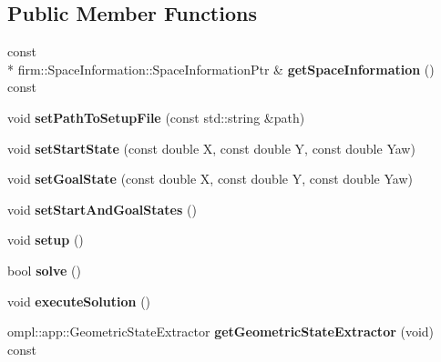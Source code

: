 \subsection*{Public Member Functions}
\begin{DoxyCompactItemize}
\item 
\hypertarget{class_multi_modal_setup_ab61d5c3e75a73f29689d25411ad3921b}{const \\*
firm\-::\-Space\-Information\-::\-Space\-Information\-Ptr \& {\bfseries get\-Space\-Information} () const }\label{class_multi_modal_setup_ab61d5c3e75a73f29689d25411ad3921b}

\item 
\hypertarget{class_multi_modal_setup_aed7eb4c5a055f28dcbe213f760750997}{void {\bfseries set\-Path\-To\-Setup\-File} (const std\-::string \&path)}\label{class_multi_modal_setup_aed7eb4c5a055f28dcbe213f760750997}

\item 
\hypertarget{class_multi_modal_setup_a1d2cbc3af654beb0d8f5f5956831011b}{void {\bfseries set\-Start\-State} (const double X, const double Y, const double Yaw)}\label{class_multi_modal_setup_a1d2cbc3af654beb0d8f5f5956831011b}

\item 
\hypertarget{class_multi_modal_setup_a3775a7921d22765b723d03c15383a8f2}{void {\bfseries set\-Goal\-State} (const double X, const double Y, const double Yaw)}\label{class_multi_modal_setup_a3775a7921d22765b723d03c15383a8f2}

\item 
\hypertarget{class_multi_modal_setup_a433d498a1c45767ab313b4247b603b9e}{void {\bfseries set\-Start\-And\-Goal\-States} ()}\label{class_multi_modal_setup_a433d498a1c45767ab313b4247b603b9e}

\item 
\hypertarget{class_multi_modal_setup_ace1ae047245985bcfaaf9d0ba135d4d3}{void {\bfseries setup} ()}\label{class_multi_modal_setup_ace1ae047245985bcfaaf9d0ba135d4d3}

\item 
\hypertarget{class_multi_modal_setup_a440372aed1696c9c12bdbba5e51989cf}{bool {\bfseries solve} ()}\label{class_multi_modal_setup_a440372aed1696c9c12bdbba5e51989cf}

\item 
\hypertarget{class_multi_modal_setup_a809d7b9433963c122c8bb57cade1b69b}{void {\bfseries execute\-Solution} ()}\label{class_multi_modal_setup_a809d7b9433963c122c8bb57cade1b69b}

\item 
\hypertarget{class_multi_modal_setup_a15f5a57cf256ef67d2b24b5a81c69866}{ompl\-::app\-::\-Geometric\-State\-Extractor {\bfseries get\-Geometric\-State\-Extractor} (void) const }\label{class_multi_modal_setup_a15f5a57cf256ef67d2b24b5a81c69866}

\end{DoxyCompactItemize}
